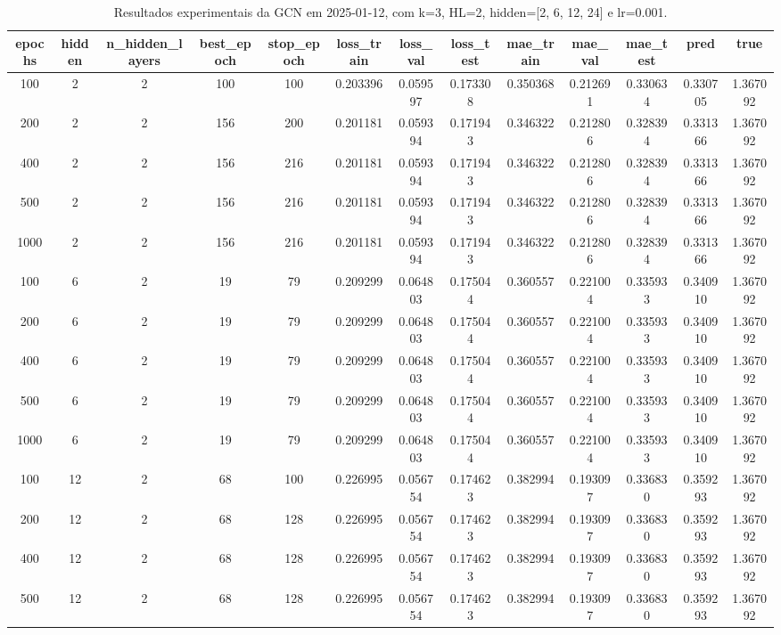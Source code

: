 \begin{table}[h]
\centering
\caption{Resultados experimentais da GCN em 2025-01-12, com k=3, HL=2, hidden=[2, 6, 12, 24] e lr=0.001.}
\label{tab:gcn_results_k3_hl2_d20250112}
\begin{tabular}{ccccccccccccc}
\toprule
epochs & hidden & n\_hidden\_layers & best\_epoch & stop\_epoch & loss\_train & loss\_val & loss\_test & mae\_train & mae\_val & mae\_test & pred & true \\
\midrule
100 & 2 & 2 & 100 & 100 & 0.203396 & 0.059597 & 0.173308 & 0.350368 & 0.212691 & 0.330634 & 0.330705 & 1.367092 \\
200 & 2 & 2 & 156 & 200 & 0.201181 & 0.059394 & 0.171943 & 0.346322 & 0.212806 & 0.328394 & 0.331366 & 1.367092 \\
400 & 2 & 2 & 156 & 216 & 0.201181 & 0.059394 & 0.171943 & 0.346322 & 0.212806 & 0.328394 & 0.331366 & 1.367092 \\
500 & 2 & 2 & 156 & 216 & 0.201181 & 0.059394 & 0.171943 & 0.346322 & 0.212806 & 0.328394 & 0.331366 & 1.367092 \\
1000 & 2 & 2 & 156 & 216 & 0.201181 & 0.059394 & 0.171943 & 0.346322 & 0.212806 & 0.328394 & 0.331366 & 1.367092 \\
100 & 6 & 2 & 19 & 79 & 0.209299 & 0.064803 & 0.175044 & 0.360557 & 0.221004 & 0.335933 & 0.340910 & 1.367092 \\
200 & 6 & 2 & 19 & 79 & 0.209299 & 0.064803 & 0.175044 & 0.360557 & 0.221004 & 0.335933 & 0.340910 & 1.367092 \\
400 & 6 & 2 & 19 & 79 & 0.209299 & 0.064803 & 0.175044 & 0.360557 & 0.221004 & 0.335933 & 0.340910 & 1.367092 \\
500 & 6 & 2 & 19 & 79 & 0.209299 & 0.064803 & 0.175044 & 0.360557 & 0.221004 & 0.335933 & 0.340910 & 1.367092 \\
1000 & 6 & 2 & 19 & 79 & 0.209299 & 0.064803 & 0.175044 & 0.360557 & 0.221004 & 0.335933 & 0.340910 & 1.367092 \\
100 & 12 & 2 & 68 & 100 & 0.226995 & 0.056754 & 0.174623 & 0.382994 & 0.193097 & 0.336830 & 0.359293 & 1.367092 \\
200 & 12 & 2 & 68 & 128 & 0.226995 & 0.056754 & 0.174623 & 0.382994 & 0.193097 & 0.336830 & 0.359293 & 1.367092 \\
400 & 12 & 2 & 68 & 128 & 0.226995 & 0.056754 & 0.174623 & 0.382994 & 0.193097 & 0.336830 & 0.359293 & 1.367092 \\
500 & 12 & 2 & 68 & 128 & 0.226995 & 0.056754 & 0.174623 & 0.382994 & 0.193097 & 0.336830 & 0.359293 & 1.367092 \\

\end{tabular}
\end{table}
